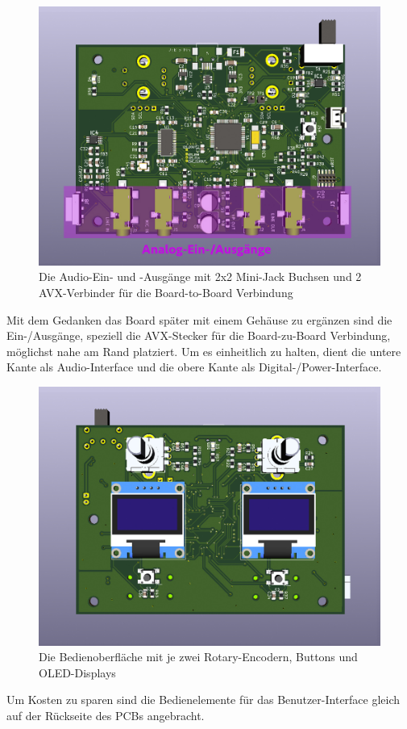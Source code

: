 \begin{figure} [H]
\begin{center}
 \includegraphics[scale=0.35]{../graphics/PCB-Layout_INOUT.jpg}
 \caption{Die Audio-Ein- und -Ausgänge mit 2x2 Mini-Jack Buchsen und 2 AVX-Verbinder für die Board-to-Board Verbindung}
\label{fig:PCB_INOUT}
\end{center}
\end{figure}

Mit dem Gedanken das Board später mit einem Gehäuse zu ergänzen sind die Ein-/Ausgänge, speziell die AVX-Stecker für die Board-zu-Board Verbindung, möglichst nahe am Rand platziert. Um es einheitlich zu halten, dient die untere Kante als Audio-Interface und die obere Kante als Digital-/Power-Interface. 

\begin{figure} [H]
\begin{center}
 \includegraphics[scale=0.35]{../graphics/PCB-Layout_GUI.jpg}
 \caption{Die Bedienoberfläche mit je zwei Rotary-Encodern, Buttons und OLED-Displays}
\label{fig:PCB_GUI}
\end{center}
\end{figure}

Um Kosten zu sparen sind die Bedienelemente für das Benutzer-Interface gleich auf der Rückseite des PCBs angebracht.
